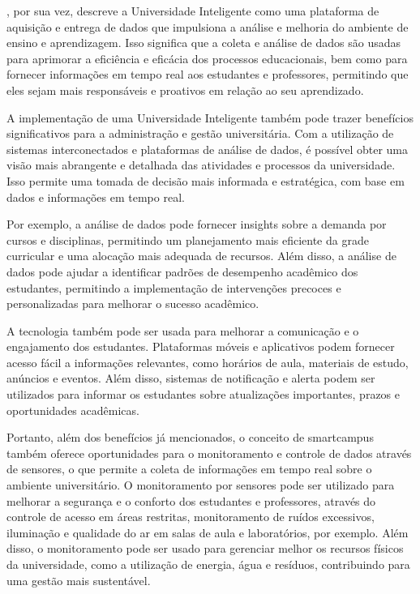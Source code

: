 \documentclass[tcc,capa]{texufpel}
\begin{document}
\citet{roth-berghofer2013smart}, por sua vez, descreve a Universidade Inteligente como uma plataforma de aquisição e entrega de dados que impulsiona a análise e melhoria do ambiente de ensino e aprendizagem. Isso significa que a coleta e análise de dados são usadas para aprimorar a eficiência e eficácia dos processos educacionais, bem como para fornecer informações em tempo real aos estudantes e professores, permitindo que eles sejam mais responsáveis e proativos em relação ao seu aprendizado.

A implementação de uma Universidade Inteligente também pode trazer benefícios significativos para a administração e gestão universitária. Com a utilização de sistemas interconectados e plataformas de análise de dados, é possível obter uma visão mais abrangente e detalhada das atividades e processos da universidade. Isso permite uma tomada de decisão mais informada e estratégica, com base em dados e informações em tempo real.

Por exemplo, a análise de dados pode fornecer insights sobre a demanda por cursos e disciplinas, permitindo um planejamento mais eficiente da grade curricular e uma alocação mais adequada de recursos. Além disso, a análise de dados pode ajudar a identificar padrões de desempenho acadêmico dos estudantes, permitindo a implementação de intervenções precoces e personalizadas para melhorar o sucesso acadêmico.

A tecnologia também pode ser usada para melhorar a comunicação e o engajamento dos estudantes. Plataformas móveis e aplicativos podem fornecer acesso fácil a informações relevantes, como horários de aula, materiais de estudo, anúncios e eventos. Além disso, sistemas de notificação e alerta podem ser utilizados para informar os estudantes sobre atualizações importantes, prazos e oportunidades acadêmicas.

Portanto, além dos benefícios já mencionados, o conceito de smartcampus também oferece oportunidades para o monitoramento e controle de dados através de sensores, o que permite a coleta de informações em tempo real sobre o ambiente universitário. O monitoramento por sensores pode ser utilizado para melhorar a segurança e o conforto dos estudantes e professores, através do controle de acesso em áreas restritas, monitoramento de ruídos excessivos, iluminação e qualidade do ar em salas de aula e laboratórios, por exemplo. Além disso, o monitoramento pode ser usado para gerenciar melhor os recursos físicos da universidade, como a utilização de energia, água e resíduos, contribuindo para uma gestão mais sustentável.
\end{document}
